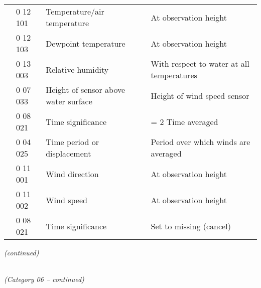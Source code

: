 \begin{longtable}[]{@{}llll@{}}
& 0 12 101 & Temperature/air temperature & At observation height\tabularnewline
& 0 12 103 & Dewpoint temperature & At observation height\tabularnewline
& 0 13 003 & Relative humidity & With respect to water at all temperatures\tabularnewline
& 0 07 033 & Height of sensor above water surface & Height of wind speed sensor\tabularnewline
& 0 08 021 & Time significance & = 2 Time averaged\tabularnewline
& 0 04 025 & Time period or displacement & Period over which winds are averaged\tabularnewline
& 0 11 001 & Wind direction & At observation height\tabularnewline
& 0 11 002 & Wind speed & At observation height\tabularnewline
& 0 08 021 & Time significance & Set to missing (cancel)\tabularnewline
\bottomrule
\end{longtable}

\emph{(continued)}

\emph{\\
(Category 06 -- continued)}

